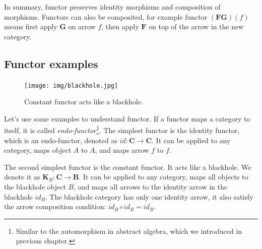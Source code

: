 \documentclass[b5paper]{article}
\begin{document}
In summary, functor preserves identity morphisms and composition of morphisms. Functors can also be composited, for example functor $(\mathbf{F} \mathbf{G})(f)$ means first apply $\mathbf{G}$ on arrow $f$, then apply $\mathbf{F}$ on top of the arrow in the new category.

\subsection{Functor examples}
\label{sec:functor:examples}

\begin{figure}
 \centering
 \texttt{[image: img/blackhole.jpg]}
 \captionsetup{labelformat=empty}
 \caption{Constant functor acts like a blackhole.}
 \label{fig:blackhole}
\end{figure}

 
Let's use some examples to understand functor. If a functor maps a category to itself, it is called {\em endo-functor}\footnote{Similar to the automorphism in abstract algebra, which we introduced in previous chapter.}. The simplest functor is the identity functor, which is an endo-functor, denoted as $id: \pmb{C} \to \pmb{C}$. It can be applied to any category, maps object $A$ to $A$, and maps arrow $f$ to $f$.

The second simplest functor is the constant functor. It acts like a blackhole. We denote it as $\mathbf{K}_B : \pmb{C} \to \pmb{B}$. It can be applied to any category, maps all objects to the blackhole object $B$, and maps all arrows to the identity arrow in the blackhole $id_B$. The blackhole category has only one identity arrow, it also satisfy the arrow composition condition: $id_B \circ id_B = id_B$.
\end{document}
